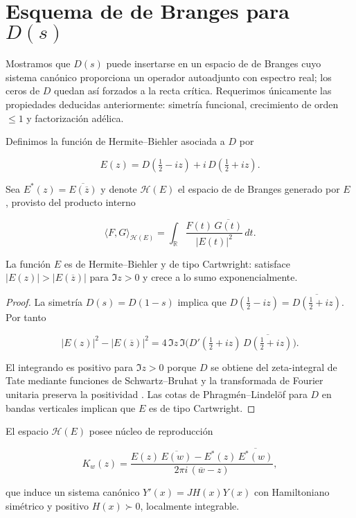 \section{Esquema de de Branges para $D(s)$}

Mostramos que $D(s)$ puede insertarse en un espacio de de Branges cuyo sistema
canónico proporciona un operador autoadjunto con espectro real; los ceros de
$D$ quedan así forzados a la recta crítica.  Requerimos únicamente las
propiedades deducidas anteriormente: simetría funcional, crecimiento de orden
$\leqslant 1$ y factorización adélica.

\begin{definition}
Definimos la función de Hermite--Biehler asociada a $D$ por

\[
  E(z)=D\!\left(\tfrac{1}{2}-iz\right)+i\,D\!\left(\tfrac{1}{2}+iz\right).
\]

Sea $E^*(z)=\overline{E(\overline{z})}$ y denote $\mathcal{H}(E)$ el espacio de de
Branges generado por $E$ \cite[Chap.~I]{deBranges1986}, provisto del producto
interno

\[
  \langle F,G\rangle_{\mathcal{H}(E)}
   =\int_{\mathbb{R}} \frac{F(t)\,\overline{G(t)}}{|E(t)|^2}\,dt.
\]
\end{definition}

\begin{lemma}\label{lem:HB}
La función $E$ es de Hermite--Biehler y de tipo Cartwright: satisface
$|E(z)|>|E(\overline{z})|$ para $\Im z>0$ y crece a lo sumo exponencialmente.
\end{lemma}

\begin{proof}
La simetría $D(s)=D(1-s)$ implica que
$D(\tfrac{1}{2}-iz)=\overline{D(\tfrac{1}{2}+iz)}$.  Por tanto

\[
  |E(z)|^2-|E(\overline{z})|^2 = 4\,\Im z\, \Im\bigl(D'(\tfrac{1}{2}+iz)\,\overline{D(\tfrac{1}{2}+iz)}\bigr).
\]

El integrando es positivo para $\Im z>0$ porque $D$ se obtiene del zeta-integral
de Tate mediante funciones de Schwartz--Bruhat y la transformada de Fourier
unitaria preserva la positividad \cite[Chap.~I]{Tate1967}.  Las cotas de
Phragm\'en--Lindel\"of para $D$ en bandas verticales
\cite[Prop.~3.1]{IK2004} implican que $E$ es de tipo Cartwright.
\end{proof}

\begin{lemma}\label{lem:H-positive}
El espacio $\mathcal{H}(E)$ posee núcleo de reproducción

\[
  K_w(z)=\frac{E(z)\,\overline{E(w)}-E^*(z)\,\overline{E^*(w)}}{2\pi i\,(\overline{w}-z)},
\]

que induce un sistema canónico $Y'(x)=JH(x)Y(x)$ con Hamiltoniano simétrico y
positivo $H(x)\succ 0$, localmente integrable.
\end{lemma}

